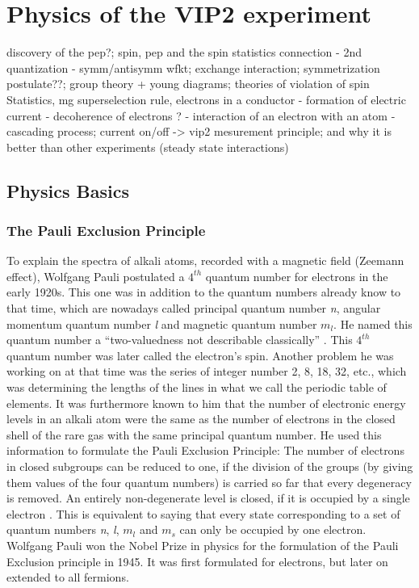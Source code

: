 \chapter{Physics of the VIP2 experiment}
\label{chap:Physics}

discovery of the pep?; spin, pep and the spin statistics connection - 2nd quantization - symm/antisymm wfkt; exchange interaction; symmetrization postulate??; group theory + young diagrams; theories of violation of spin Statistics, mg superselection rule, electrons in a conductor - formation of electric current - decoherence of electrons ? - interaction of an electron with an atom - cascading process; current on/off -> vip2 mesurement principle; and why it is better than other experiments (steady state interactions) 

\section{Physics Basics}
\label{sec:PhysicsBasics}

\subsection{The Pauli Exclusion Principle}
\label{sec:pep}

To explain the spectra of alkali atoms, recorded with a magnetic field (Zeemann effect), Wolfgang Pauli postulated a $4^{th}$ quantum number for electrons in the early 1920s. This one was in addition to the quantum numbers already know to that time, which are nowadays called principal quantum number \textit{n}, angular momentum quantum number \textit{l} and magnetic quantum number \textit{$m_{l}$}. He named this quantum number a ``two-valuedness not describable classically'' \cite{Pauli1946}. This $4^{th}$ quantum number was later called the electron's spin. Another problem he was working on at that time was the series of integer number 2, 8, 18, 32, etc., which was determining the lengths of the lines in what we call the periodic table of elements. It was furthermore known to him that the number of electronic energy levels in an alkali atom were the same as the number of electrons in the closed shell of the rare gas with the same principal quantum number. He used this information to formulate the Pauli Exclusion Principle: The number of electrons in closed subgroups can be reduced to one, if the division of the groups (by giving them values of the four quantum numbers) is carried so far that every degeneracy is removed. An entirely non-degenerate level is closed, if it is occupied by a single electron \cite{Pauli1946}. This is equivalent to saying that every state corresponding to a set of quantum numbers \textit{n}, \textit{l}, \textit{$m_{l}$} and \textit{$m_{s}$} can only be occupied by one electron. Wolfgang Pauli won the Nobel Prize in physics for the formulation of the Pauli Exclusion principle in 1945. It was first formulated for electrons, but later on extended to all fermions.

